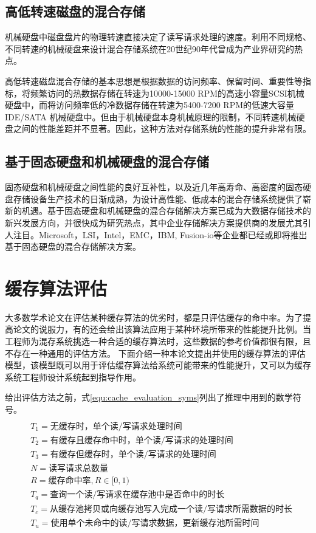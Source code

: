 \subsection{高低转速磁盘的混合存储}

机械硬盘中磁盘盘片的物理转速直接决定了读写请求处理的速度。利用不同规格、不同转速的机械硬盘来设计混合存储系统在20世纪90年代曾成为产业界研究的热点。

高低转速磁盘混合存储的基本思想是根据数据的访问频率、保留时间、重要性等指标，将频繁访问的热数据存储在转速为10000-15000 RPM的高速小容量SCSI机械硬盘中，而将访问频率低的冷数据存储在转速为5400-7200 RPM的低速大容量IDE/SATA 机械硬盘中。但由于机械硬盘本身机械原理的限制，不同转速机械硬盘之间的性能差距并不显著。因此，这种方法对存储系统的性能的提升非常有限。

\subsection{基于固态硬盘和机械硬盘的混合存储}

固态硬盘和机械硬盘之间性能的良好互补性，以及近几年高寿命、高密度的固态硬盘存储设备生产技术的日渐成熟，为设计高性能、低成本的混合存储系统提供了崭新的机遇。基于固态硬盘和机械硬盘的混合存储解决方案已成为大数据存储技术的新兴发展方向，并很快成为研究热点，其中企业存储解决方案提供商的发展尤其引人注目。Microsoft，LSI，Intel，EMC，IBM, Fusion-io等企业都已经或即将推出基于固态硬盘的混合存储解决方案。

\section{缓存算法评估}
\label{sec:cache_evaluation}

大多数学术论文在评估某种缓存算法的优劣时，都是只评估缓存的命中率。为了提高论文的说服力，有的还会给出该算法应用于某种环境所带来的性能提升比例。当工程师为混存系统挑选一种合适的缓存算法时，这些数据的参考价值都很有限，且不存在一种通用的评估方法。
下面介绍一种本论文提出并使用的缓存算法的评估模型，该模型既可以用于评估缓存算法给系统可能带来的性能提升，又可以为缓存系统工程师设计系统起到指导作用。

给出评估方法之前，式\ref{equ:cache_evaluation_syms}列出了推理中用到的数学符号。
\begin{equation}
\begin{split}
\\&T_1=\mbox{无缓存时，单个读/写请求处理时间}
\\&T_2=\mbox{有缓存且缓存命中时，单个读/写请求的处理时间}
\\&T_3=\mbox{有缓存但缓存时，单个读/写请求的处理时间}
\\&N=\mbox{读写请求总数量}
\\&R=\mbox{缓存命中率},R\in\lbrack0,1)
\\&T_q=\mbox{查询一个读/写请求在缓存池中是否命中的时长}
\\&T_c=\mbox{从缓存池拷贝或向缓存池写入完成一个读/写请求所需数据的时长}
\\&T_u=\mbox{使用单个未命中的读/写请求数据，更新缓存池所需时间}
\end{split}
\label{equ:cache_evaluation_syms}
\end{equation}

